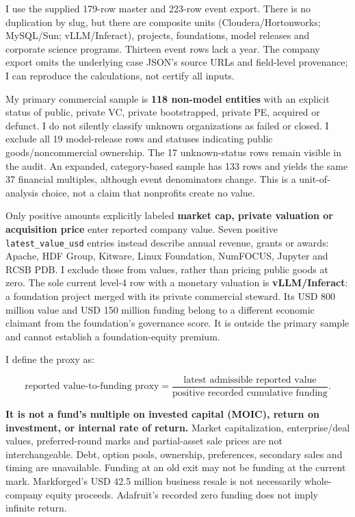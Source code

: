 I use the supplied 179-row master and 223-row event export. There is no
duplication by slug, but there are composite units
(Cloudera/Hortonworks; MySQL/Sun; vLLM/Inferact), projects, foundations,
model releases and corporate science programs. Thirteen event rows lack
a year. The company export omits the underlying case JSON's source URLs
and field-level provenance; I can reproduce the calculations, not
certify all inputs. \citep{InputData,InputSchema}

My primary commercial sample is \textbf{118 non-model entities} with an
explicit status of public, private VC, private bootstrapped, private PE,
acquired or defunct. I do not silently classify unknown organizations as
failed or closed. I exclude all 19 model-release rows and statuses
indicating public goods/noncommercial ownership. The 17 unknown-status
rows remain visible in the audit. An expanded, category-based sample has
133 rows and yields the same 37 financial multiples, although event
denominators change. This is a unit-of-analysis choice, not a claim that
nonprofits create no value.

Only positive amounts explicitly labeled \textbf{market cap, private
valuation or acquisition price} enter reported company value. Seven
positive \texttt{latest\_value\_usd} entries instead describe annual
revenue, grants or awards: Apache, HDF Group, Kitware, Linux Foundation,
NumFOCUS, Jupyter and RCSB PDB. I exclude those from values, rather than
pricing public goods at zero. The sole current level-4 row with a
monetary valuation is \textbf{vLLM/Inferact}: a foundation project
merged with its private commercial steward. Its USD 800 million value
and USD 150 million funding belong to a different economic claimant from
the foundation's governance score. It is outside the primary sample and
cannot establish a foundation-equity premium.

I define the proxy as:

\[\text{reported value-to-funding proxy} = \frac{\text{latest admissible reported value}}{\text{positive recorded cumulative funding}}.\]

\textbf{It is not a fund's multiple on invested capital (MOIC), return
on investment, or internal rate of return.} Market capitalization,
enterprise/deal values, preferred-round marks and partial-asset sale
prices are not interchangeable. Debt, option pools, ownership,
preferences, secondary sales and timing are unavailable. Funding at an
old exit may not be funding at the current mark. Markforged's USD 42.5
million business resale is not necessarily whole-company equity
proceeds. Adafruit's recorded zero funding does not imply infinite
return.

